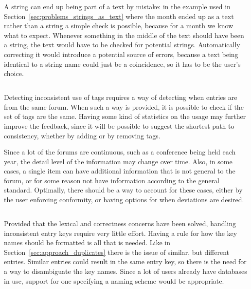 A {\bibtex} string can end up being part of a text by mistake: in the
example used in Section~\ref{sec:problems_strings_as_text} where the
month ended up as a text rather than a string a simple check is
possible, because for a month we know what to expect.  Whenever
something in the middle of the text should have been a string, the
text would have to be checked for potential strings.  Automatically
correcting it would introduce a potential source of errors, because a
text being identical to a string name could just be a coincidence, so
it has to be the user's choice.


\subsection{}

Detecting inconsistent use of tags requires a way of detecting when
entries are from the same forum.  When such a way is provided, it is
possible to check if the set of tags are the same.  Having some kind
of statistics on the usage may further improve the feedback, since it
will be possible to suggest the shortest path to consistency, whether
by adding or by removing tags.

Since a lot of the forums are continuous, such as a conference being
held each year, the detail level of the information may change over
time.  Also, in some cases, a single item can have additional
information that is not general to the forum, or for some reason not
have information according to the general standard.  Optimally, there
should be a way to account for these cases, either by the user
enforcing conformity, or having options for when deviations are desired.


\subsection{}

Provided that the lexical and correctness concerns have been solved,
handling inconsistent entry keys require very little effort.  Having a
rule for how the key names should be formatted is all that is needed.
Like in Section~\ref{sec:approach_duplicates} there is the issue of
similar, but different entries.  Similar entries could result in the
same entry key, so there is the need for a way to disambiguate the key
names.  Since a lot of users already have databases in use, support
for one specifying a naming scheme would be appropriate.


